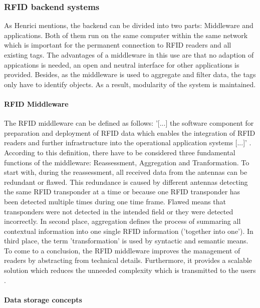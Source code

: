 \subsubsection{RFID backend systems} \label{backend}

As Henrici \cite{henrici} mentions, the backend can be divided into two parts: Middleware and applications. Both of them run on the same computer within the same network which is important for the permanent connection to RFID readers and all existing tags. The advantages of a middleware in this use are that no adaption of appications is needed, an open and neutral interface for other applications is provided. Besides, as the middleware is used to aggregate and filter data, the tags only have to identify objects. As a result, modularity of the system is maintained.

\paragraph{RFID Middleware}

The RFID middleware can be defined as follows: '[...] the software component for preparation and deployment of RFID data which enables the integration of RFID readers and further infrastructure into the operational application systems [...]' \cite[p.20 ff.]{fokus}. According to this definition, there have to be considered three fundamental functions of the middleware: Reassessment, Aggregation and Tranformation. To start with, during the reassessment, all received data from the antennas can be redundant or flawed. This redundance is caused by different antennas detecting the same RFID transponder at a time or because one RFID transponder has been detected multiple times during one time frame. Flawed means that transponders were not detected in the intended field or they were detected incorrectly. In second place, aggregation defines the process of summaring all contextual information into one single RFID information ('together into one'). In third place, the term 'transformation' is used by syntactic and semantic means. 
To come to a conclusion, the RFID middleware improves the management of readers by abstracting from technical details. Furthermore, it provides a scalable solution which reduces the unneeded complexity which is transmitted to the users \cite[p.20 ff.]{fokus}.   

\paragraph{Data storage concepts}

